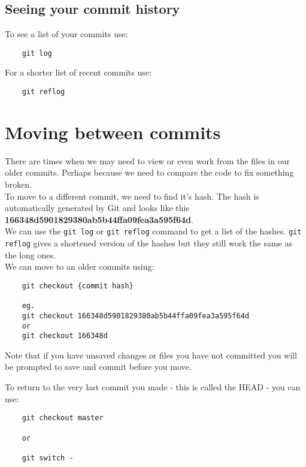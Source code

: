 \subsection{Seeing your commit history}

To see a list of your commits use:

\begin{verbatim}
    git log
\end{verbatim}

For a shorter list of recent commits use:

\begin{verbatim}
    git reflog
\end{verbatim}


\section{Moving between commits}

There are times when we may need to view or even work from the files in our older commits. Perhaps because we need to compare the code to fix something broken.
\\

To move to a different commit, we need to find it's hash. The hash is automatically generated by Git and looks like this \textbf{166348d5901829380ab5b44ffa09fea3a595f64d}. 
\\

We can use the \texttt{git log} or \texttt{git reflog} command to get a list of the hashes. \texttt{git reflog} gives a shortened version of the hashes but they still work the same as the long ones.
\\

We can move to an older commits using:

\begin{verbatim}
    git checkout {commit hash}

    eg.
    git checkout 166348d5901829380ab5b44ffa09fea3a595f64d
    or
    git checkout 166348d
\end{verbatim}

Note that if you have unsaved changes or files you have not committed you will be prompted to save and commit before you move.

To return to the very last commit you made - this is called the HEAD - you can use:

\begin{verbatim}
    git checkout master

	or

	git switch -
\end{verbatim}



